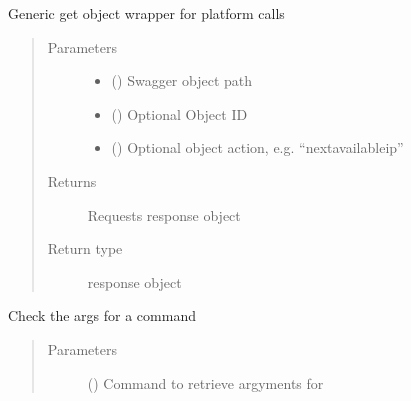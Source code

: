 \documentclass[letterpaper,10pt,english]{sphinxmanual}
\begin{document}
\begin{fulllineitems}
\begin{fulllineitems}
\end{fulllineitems}


\begin{fulllineitems}
\label{\detokenize{b1diagnostics-class:bloxone.b1diagnostics.get}}
\sphinxAtStartPar
Generic get object wrapper for platform calls
\begin{quote}\begin{description}
\item[{Parameters}] \leavevmode\begin{itemize}
\item {} 
\sphinxAtStartPar
{} () \textendash{} Swagger object path

\item {} 
\sphinxAtStartPar
{} () \textendash{} Optional Object ID

\item {} 
\sphinxAtStartPar
{} () \textendash{} Optional object action, e.g. “nextavailableip”

\end{itemize}

\item[{Returns}] \leavevmode
\sphinxAtStartPar
Requests response object

\item[{Return type}] \leavevmode
\sphinxAtStartPar
response object

\end{description}\end{quote}

\end{fulllineitems}


\begin{fulllineitems}
\label{\detokenize{b1diagnostics-class:bloxone.b1diagnostics.get_args}}
\sphinxAtStartPar
Check the args for a command
\begin{quote}\begin{description}
\item[{Parameters}] \leavevmode
\sphinxAtStartPar
{} () \textendash{} Command to retrieve argyments for


\end{description}
\end{quote}
\end{fulllineitems}
\end{fulllineitems}
\end{document}
